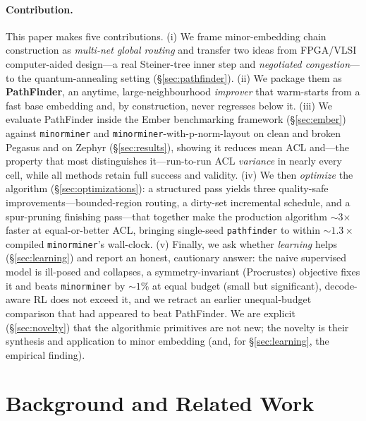\documentclass[acmsmall,anonymous,nonacm]{acmart}
\begin{document}
\paragraph{Contribution.}
This paper makes five contributions. (i) We frame minor-embedding chain
construction as \emph{multi-net global routing} and transfer two ideas from
FPGA/VLSI computer-aided design---a real Steiner-tree inner step and
\emph{negotiated congestion}---to the quantum-annealing setting
(\S\ref{sec:pathfinder}). (ii) We package them as \textbf{PathFinder}, an
anytime, large-neighbourhood \emph{improver} that warm-starts from a fast base
embedding and, by construction, never regresses below it. (iii) We evaluate PathFinder
inside the Ember benchmarking framework (\S\ref{sec:ember}) against
\texttt{minorminer} and \texttt{minorminer}-with-p-norm-layout on clean and
broken Pegasus and on Zephyr (\S\ref{sec:results}), showing it reduces mean
ACL and---the property that most distinguishes it---run-to-run ACL
\emph{variance} in nearly every cell, while all methods retain full success and
validity. (iv) We then \emph{optimize} the algorithm (\S\ref{sec:optimizations}):
a structured pass yields three quality-safe improvements---bounded-region
routing, a dirty-set incremental schedule, and a spur-pruning finishing
pass---that together make the production algorithm $\sim$3$\times$ faster at
equal-or-better ACL, bringing single-seed \texttt{pathfinder} to within
${\sim}1.3\times$ compiled \texttt{minorminer}'s wall-clock. (v) Finally, we ask
whether \emph{learning} helps (\S\ref{sec:learning}) and report an honest, cautionary
answer: the naive supervised model is ill-posed and collapses, a symmetry-invariant
(Procrustes) objective fixes it and beats \texttt{minorminer} by ${\sim}1\%$ at equal
budget (small but significant), decode-aware RL does not exceed it, and we retract an
earlier unequal-budget comparison that had appeared to beat PathFinder. We are explicit
(\S\ref{sec:novelty}) that the
algorithmic primitives are not new; the novelty is their synthesis and
application to minor embedding (and, for \S\ref{sec:learning}, the empirical finding).

\section{Background and Related Work}
\label{sec:related}
\end{document}
